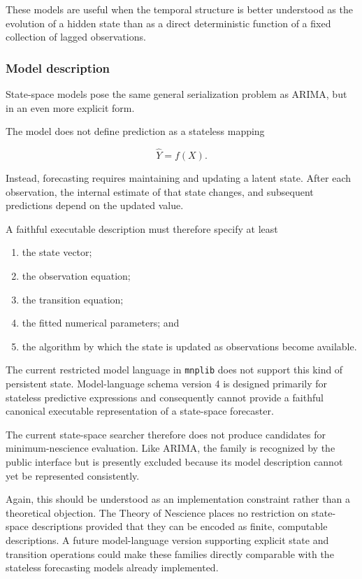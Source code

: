 These models are useful when the temporal structure is better understood as the
evolution of a hidden state than as a direct deterministic function of a fixed
collection of lagged observations.

\subsubsection{Model description}

State-space models pose the same general serialization problem as ARIMA, but
in an even more explicit form.

The model does not define prediction as a stateless mapping

\[
\widehat Y=f(X).
\]

Instead, forecasting requires maintaining and updating a latent state. After
each observation, the internal estimate of that state changes, and subsequent
predictions depend on the updated value.

A faithful executable description must therefore specify at least

\begin{enumerate}
    \item the state vector;
    \item the observation equation;
    \item the transition equation;
    \item the fitted numerical parameters; and
    \item the algorithm by which the state is updated as observations become
          available.
\end{enumerate}

The current restricted model language in \texttt{mnplib} does not support this
kind of persistent state. Model-language schema version 4 is designed primarily
for stateless predictive expressions and consequently cannot provide a faithful
canonical executable representation of a state-space forecaster.

The current state-space searcher therefore does not produce candidates for
minimum-nescience evaluation. Like ARIMA, the family is recognized by the
public interface but is presently excluded because its model description cannot
yet be represented consistently.

Again, this should be understood as an implementation constraint rather than a
theoretical objection. The Theory of Nescience places no restriction on
state-space descriptions provided that they can be encoded as finite,
computable descriptions. A future model-language version supporting explicit
state and transition operations could make these families directly comparable
with the stateless forecasting models already implemented.

